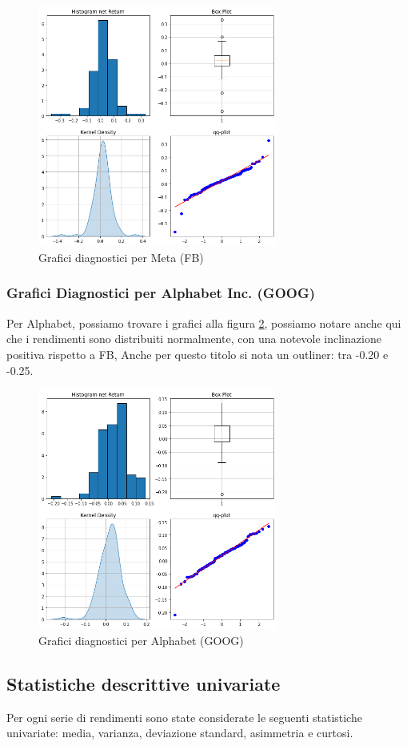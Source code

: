 \documentclass{article}
\begin{document}
\begin{figure}[p]
  \centering
  \includegraphics[width=0.7\textwidth]{meta_diagn.png}
  \caption{Grafici diagnostici per Meta (FB)}
  \label{fig:meta_diagn}
\end{figure}

\subsubsection{Grafici Diagnostici per Alphabet Inc. (GOOG)}

Per Alphabet, possiamo trovare i grafici alla figura \ref{fig:goog_diagn}, possiamo notare anche qui che i rendimenti sono distribuiti normalmente, con una notevole inclinazione positiva rispetto a FB,
Anche per questo titolo si nota un outliner: tra -0.20 e -0.25.

\begin{figure}[p]
  \centering
  \includegraphics[width=0.7\textwidth]{goog_tecn.png}
  \caption{Grafici diagnostici per Alphabet (GOOG)}
  \label{fig:goog_diagn}
\end{figure}

\pagebreak

\subsection{Statistiche descrittive univariate}

Per ogni serie di rendimenti sono state considerate le seguenti statistiche univariate: media, varianza, deviazione standard, asimmetria e curtosi.




\nocite{*}
\end{document}
